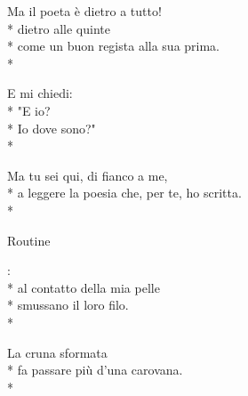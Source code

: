 \documentclass[12pt]{book}
\begin{document}
\begin{poem}{}{}
\begin{altverse}
Ma il poeta è dietro a tutto! \\*
dietro alle quinte \\*
come un buon regista alla sua prima. \\*
\end{altverse}

\begin{altverse}
E mi chiedi: \\*
"E io? \\*
Io dove sono?" \\*
\end{altverse}

\begin{altverse}
Ma tu sei qui, di fianco a me, \\*
a leggere la poesia che, per te, ho scritta. \\*
\end{altverse}


\end{poem}

\begin{poem}{Routine}{}

\settowidth{\versewidth}{non meno è ciò che meriti.}

\begin{altverse}
:\\*
al contatto della mia pelle \\*
smussano il loro filo. \\*
\end{altverse}


\begin{altverse}
La cruna sformata \\*
fa passare più d'una carovana. \\*
\end{altverse}


\end{poem}
\end{document}

